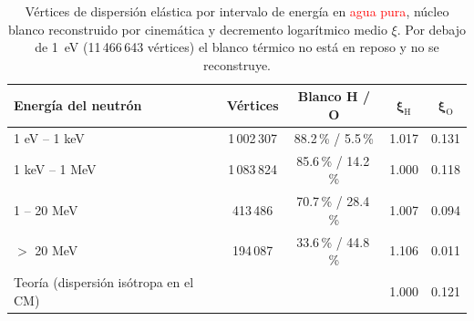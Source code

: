 \begin{table}[!htbp]
	\centering
	\small
	\captionsetup{width=\linewidth,justification=justified,singlelinecheck=false}
	\caption[Vértices de dispersión elástica y decremento logarítmico medio]{Vértices de dispersión elástica por intervalo de energía en \textcolor{red}{agua pura}, núcleo blanco reconstruido por cinemática y decremento logarítmico medio $\xi$. Por debajo de 1~eV (11\,466\,643 vértices) el blanco térmico no está en reposo y no se reconstruye.}
	\label{tab:elasticas}
	\renewcommand{\arraystretch}{1.15}
	\begin{tabular}{lcccc}
		\toprule
		\textbf{Energía del neutrón} & \textbf{Vértices} & \textbf{Blanco H / O} & $\boldsymbol{\xi_{\mathrm{H}}}$ & $\boldsymbol{\xi_{\mathrm{O}}}$ \\
		\midrule
		1 eV -- 1 keV & 1\,002\,307 & 88.2\,\% / 5.5\,\% & 1.017 & 0.131 \\
		1 keV -- 1 MeV & 1\,083\,824 & 85.6\,\% / 14.2\,\% & 1.000 & 0.118 \\
		1 -- 20 MeV & 413\,486 & 70.7\,\% / 28.4\,\% & 1.007 & 0.094 \\
		$>$ 20 MeV & 194\,087 & 33.6\,\% / 44.8\,\% & 1.106 & 0.011 \\
		\midrule
		Teoría (dispersión isótropa en el CM) & & & 1.000 & 0.121 \\
		\bottomrule
	\end{tabular}
\end{table}

